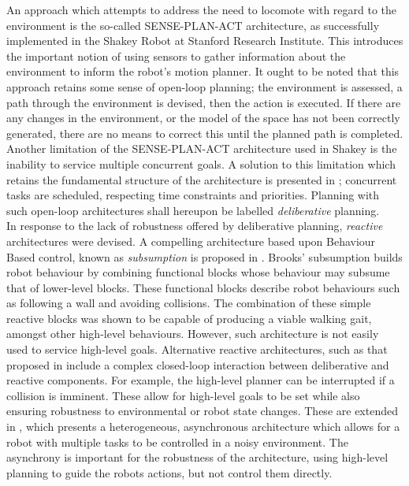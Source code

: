 An approach which attempts to address the need to locomote with regard to the environment is the so-called SENSE-PLAN-ACT architecture, as successfully implemented in the Shakey Robot at Stanford Research Institute\cite{shakey1968}. This introduces the important notion of using sensors to gather information about the environment to inform the robot's motion planner.  It ought to be noted that this approach retains some sense of open-loop planning; the environment is assessed, a path through the environment is devised, then the action is executed. If there are any changes in the environment, or the model of the space has not been correctly generated, there are no means to correct this until the planned path is completed. Another limitation of the SENSE-PLAN-ACT architecture used in Shakey is the inability to service multiple concurrent goals. A solution to this limitation which retains the fundamental structure of the architecture is presented in \cite{vere1983planning}; concurrent tasks are scheduled, respecting time constraints and priorities. Planning with such open-loop architectures shall hereupon be labelled \textit{deliberative} planning.\\

In response to the lack of robustness offered by deliberative planning, \textit{reactive} architectures were devised. A compelling architecture based upon Behaviour Based control, known as \textit{subsumption} is proposed in \cite{brooks1986robust}. Brooks' subsumption builds robot behaviour by combining functional blocks whose behaviour may subsume that of lower-level blocks. These functional blocks describe robot behaviours such as following a wall and avoiding collisions. The combination of these simple reactive blocks was shown to be capable of producing a viable walking gait, amongst other high-level behaviours. However, such architecture is not easily used to service high-level goals. Alternative reactive architectures, such as that proposed in \cite{georgeff1987reactive} include a complex closed-loop interaction between deliberative and reactive components. For example, the high-level planner can be interrupted if a collision is imminent. These allow for high-level goals to be set while also ensuring robustness to environmental or robot state changes. These are extended in \cite{gat1992integrating}, which presents a heterogeneous, asynchronous architecture which allows for a robot with multiple tasks to be controlled in a noisy environment. The asynchrony is important for the robustness of the architecture, using high-level planning to guide the robots actions, but not control them directly. \\

